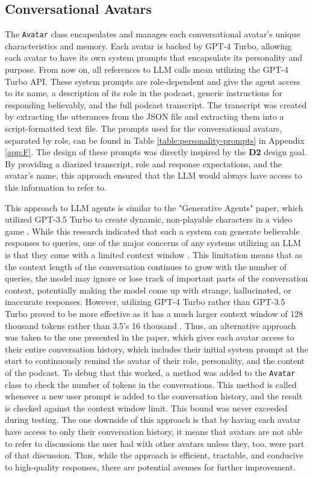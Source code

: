 \documentclass[12pt]{report}
\begin{document}
\begin{myfont}
        \subsection{Conversational Avatars}
        The \texttt{Avatar} class encapsulates and manages each conversational avatar's unique characteristics and memory. Each avatar is backed by GPT-4 Turbo, allowing each avatar to have its own system prompts that encapsulate its personality and purpose. From now on, all references to LLM calls mean utilizing the GPT-4 Turbo API. These system prompts are role-dependent and give the agent access to its name, a description of its role in the podcast, generic instructions for responding believably, and the full podcast transcript. The transcript was created by extracting the utterances from the JSON file and extracting them into a script-formatted text file. The prompts used for the conversational avatars, separated by role, can be found in Table \ref{table:personality-prompts} in Appendix \ref{app:F}. The design of these prompts was directly inspired by the \textbf{D2} design goal. By providing a diarized transcript, role and response expectations, and the avatar's name, this approach ensured that the LLM would always have access to this information to refer to.
        
        \indent This approach to LLM agents is similar to the "Generative Agents" paper, which utilized GPT-3.5 Turbo to create dynamic, non-playable characters in a video game \citep{Park2023GenerativeAgents}. While this research indicated that such a system can generate believable responses to queries, one of the major concerns of any systems utilizing an LLM is that they come with a limited context window \citep{OpenAI2023GPT4}\citep{Park2023GenerativeAgents}. This limitation means that as the context length of the conversation continues to grow with the number of queries, the model may ignore or lose track of important parts of the conversation context, potentially making the model come up with strange, hallucinated, or inaccurate responses. However, utilizing GPT-4 Turbo rather than GPT-3.5 Turbo proved to be more effective as it has a much larger context window of 128 thousand tokens rather than 3.5's 16 thousand \citep{OpenAI2023GPT4}. Thus, an alternative approach was taken to the one presented in the paper, which gives each avatar access to their entire conversation history, which includes their initial system prompt at the start to continuously remind the avatar of their role, personality, and the content of the podcast. To debug that this worked, a method was added to the \texttt{Avatar} class to check the number of tokens in the conversations. This method is called whenever a new user prompt is added to the conversation history, and the result is checked against the context window limit. This bound was never exceeded during testing. The one downside of this approach is that by having each avatar have access to only their conversation history, it means that avatars are not able to refer to discussions the user had with other avatars unless they, too, were part of that discussion. Thus,  while the approach is efficient, tractable, and conducive to high-quality responses, there are potential avenues for further improvement.


\end{myfont}
\end{document}
